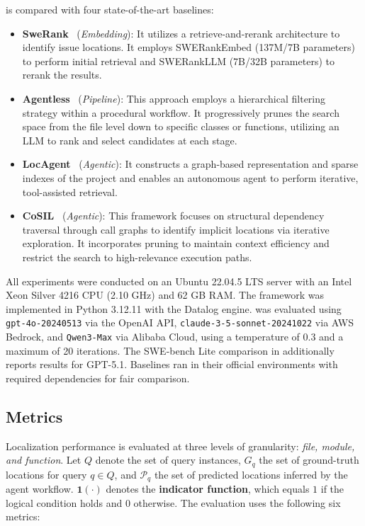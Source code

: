 \tooldataloc is compared with four state-of-the-art baselines:
\begin{itemize}[leftmargin=*]
    \item \textbf{SweRank}~\cite{reddy2025swerank} (\textit{Embedding}): It utilizes a retrieve-and-rerank architecture to identify issue locations. It employs SWERankEmbed (137M/7B parameters) to perform initial retrieval and SWERankLLM (7B/32B parameters) to rerank the results.
    \item \textbf{Agentless}~\cite{xia2024agentless} (\textit{Pipeline}): This approach employs a hierarchical filtering strategy within a procedural workflow. It progressively prunes the search space from the file level down to specific classes or functions, utilizing an LLM to rank and select candidates at each stage.
    \item \textbf{LocAgent}~\cite{chen-etal-2025-locagent} (\textit{Agentic}): It constructs a graph-based representation and sparse indexes of the project and enables an autonomous agent to perform iterative, tool-assisted retrieval.
    \item \textbf{CoSIL}~\cite{jiang2025cosil} (\textit{Agentic}): This framework focuses on structural dependency traversal through call graphs to identify implicit locations via iterative exploration. It incorporates pruning to maintain context efficiency and restrict the search to high-relevance execution paths.
\end{itemize}

All experiments were conducted on an Ubuntu 22.04.5 LTS server with an Intel Xeon Silver 4216 CPU (2.10 GHz) and 62 GB RAM. The framework was implemented in Python 3.12.11 with the  Datalog engine. \tooldataloc was evaluated using \texttt{gpt-4o-20240513} via the OpenAI API, \texttt{claude-3-5-sonnet-20241022} via AWS Bedrock, and \texttt{Qwen3-Max} via Alibaba Cloud, using a temperature of 0.3 and a maximum of 20 iterations. The SWE-bench Lite comparison in  additionally reports results for GPT-5.1. Baselines ran in their official environments with required dependencies for fair comparison.

\subsection{Metrics}
Localization performance is evaluated at three levels of granularity: \textit{file, module, and function}. Let $Q$ denote the set of query instances, $G_q$ the set of ground-truth locations for query $q \in Q$, and $\mathcal{P}_q$ the set of predicted locations inferred by the agent workflow. $\mathbf{1}(\cdot)$ denotes the \textbf{indicator function}, which equals $1$ if the logical condition holds and $0$ otherwise. The evaluation uses the following six metrics:

